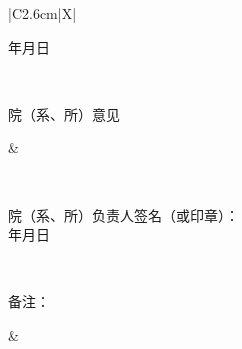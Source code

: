 \documentclass[UTF8,a4paper,zihao=-4]{ctexart}
\newcommand{\emptyline}[1][4.5cm]{\underline{\makebox[#1]{}}}
\newcommand{\vlabel}[2]{%
\begin{minipage}[c][#1][c]{\linewidth}
\centering #2
\end{minipage}%
}
\begin{document}
\begin{tabularx}{\textwidth}{|C{2.6cm}|X|}
\begin{minipage}[c][12.6cm][t]{0.96\linewidth}
            \vfill
            \begin{flushright}
                年\hspace{1.5em}月\hspace{1.5em}日
            \end{flushright}
            
            \vspace{0.1em}
        \end{minipage}
        \\ \hline
        
        \vlabel{3.0cm}{院（系、所）意见}
        &
        \begin{minipage}[c][2.0cm][t]{0.96\linewidth}
            \vfill
            \hspace{1.5em} \\
            \begin{flushright}
                院（系、所）负责人签名（或印章）：\emptyline[4.0cm]\\[0.35em]
                年\hspace{1.5em}月\hspace{1.5em}日
            \end{flushright}
            \vspace{0.1em}
        \end{minipage}
        \\ \hline
        
        \vlabel{1.25cm}{备注：}
        &
        \begin{minipage}[c][2cm][t]{0.96\linewidth}
            \hspace{1cm}
        \end{minipage}
        \\ \hline
        
    \end{tabularx}

\endgroup
\end{document}
